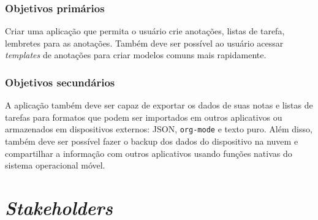 \documentclass[
	12pt,				%
	oneside,			%
	a4paper,			%
	english,			%
	brazil,				%
	]{abntex2}
\begin{document}
\subsection{Objetivos primários}
Criar uma aplicação que permita o usuário crie anotações, listas de tarefa, lembretes para as anotações. Também deve ser possível ao usuário acessar \textit{templates} de anotações para criar modelos comuns mais rapidamente.

\subsection{Objetivos secundários}
A aplicação também deve ser capaz de exportar os dados de suas notas e listas de tarefas para formatos que podem ser importados em outros aplicativos ou armazenados em dispositivos externos: JSON, \texttt{org-mode} e texto puro. Além disso, também deve ser possível fazer o backup dos dados do dispositivo na nuvem e compartilhar a informação com outros aplicativos usando funções nativas do sistema operacional móvel.

\chapter{\foreignlanguage{english}{\textit{Stakeholders}}}
\end{document}
